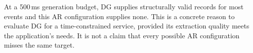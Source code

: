 \begin{table}[ht]
\centering
\caption{Generation-budget coverage (\%). Valid also requires the harness
schema check. All recorded events remain in the denominator; semantic
correctness and downstream processing are not assessed here.}
\label{tab:budgets}

\end{table}

At a 500\,ms generation budget, DG supplies structurally valid records
for most events and this AR configuration supplies none. This is a
concrete reason to evaluate DG for a time-constrained service, provided its
extraction quality meets the application's needs. It is not a claim that
every possible AR configuration misses the same target.
